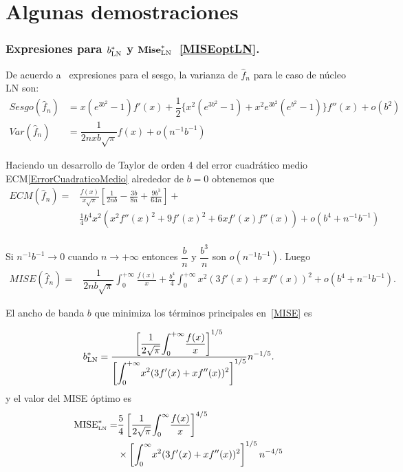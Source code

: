 \chapter{Algunas demostraciones}

\subsection{Expresiones para $b_{\small{\text{LN}}}^*$ y $\textbf{Mise}_{\small{\text{LN}}}^*$~\eqref{MISEoptLN}.}
\label{byMiseOptLN}
\begin{dem}
	De acuerdo a~\cite{Libnegue2013} expresiones para el sesgo, la varianza de $\widehat{f}_n$ para le caso de núcleo LN son:
	\begin{align}
	Sesgo(\widehat{f}_n)&=x(e^{3 b^2}-1) f'(x)+\dfrac{1}{2}\{x^2(e^{3 b^2}-1)+x^2 e^{3b^2}(e^{b^2}-1)\}f''(x)+o(b^2)\\
	Var(\widehat{f}_n)&=\dfrac{1}{2 n x b \sqrt{\pi}} f(x)+o(n^{-1}b^{-1})
	\end{align}
	
	Haciendo un desarrollo de Taylor de orden 4 del error cuadrático medio ECM\eqref{ErrorCuadraticoMedio} alrededor de $b=0$ obtenemos que
	\begin{align}
	ECM(\widehat{f}_n)=&\frac{f(x)}{x \sqrt{\pi}}\left[\frac{1}{2 n b}-\frac{3 b}{8 n}+\frac{9 b^3}{64 n}\right]+\\
	&\frac{1}{4} b^4 x^2 \left(x^2 f''(x)^2+9 f'(x)^2+6 x f'(x) f''(x)\right)+o\left(b^4+n^{-1}b^{-1}\right)\\
	\end{align}
	
	Si $n^{-1}b^{-1} \to 0$ cuando $n \to +\infty$ entonces $\dfrac{b}{n}$ y $\dfrac{b^3}{n}$ son $o(n^{-1}b^{-1})$.
	Luego
	\begin{align}
	\label{MISE:apendice}
	MISE(\widehat{f}_n)=&\dfrac{1}{2 n b \sqrt{\pi}} \int_{0}^{+\infty}\frac{f(x)}{x}+\frac{b^4}{4} \int_{0}^{+\infty} x^2\left(3f'(x)+xf''(x)\right)^2+o\left(b^4+n^{-1}b^{-1}\right).
	\end{align}
	
	El ancho de banda $b$ que minimiza los términos principales en~\ref{MISE} es 
	
	\begin{align}
	b_{\small{\text{LN}}}^*=\dfrac{\left[\dfrac{1}{2\sqrt{\pi}}\displaystyle{\int_0^{+\infty}}\frac{f(x)}{x}\right]^{1/5}}{\left[\displaystyle{\int_0^{+\infty}} x^2(3f'(x)+xf''(x))^2\right]^{1/5}}n^{-1/5}.
	\end{align}
	y el valor del MISE óptimo es
	\begin{align}
	\text{MISE}^*_{\text{\tiny{LN}}}=&\dfrac{5}{4}  \left[\dfrac{1}{2\sqrt{\pi}}\displaystyle{\int_{0}^{\infty}} \frac{f(x)}{x} \right]^{4/5} \\
	&\times \left[\displaystyle{\int_{0}^{\infty}}  x^2 (3 f'(x) + x f''(x))^2 \right]^{1/5} n^{-4/5} 
	\end{align}
\end{dem}


